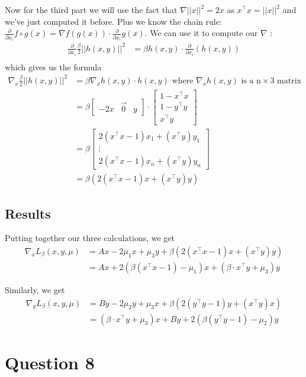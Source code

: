 \documentclass{article}
\newcommand{\tp}{^\top}
\newcommand{\p}{\frac{\partial}{\partial x_i}}
\begin{document}
Now for the third part we will use the fact that $\nabla||x||^2=2x$ as $x\tp x=||x||^2$ and we've just computed it before. Plus we know the chain rule: $\p f\circ g(x)= \nabla f (g(x)) \cdot \p g(x)$. We can use it to compute our $\nabla$ :
\begin{align*}
\p \frac{\beta}{2} ||h(x,y)||^2&=\beta h(x,y) \cdot \p(h(x,y))\\
\end{align*}
which gives us the formula
\begin{align*}
\nabla_x \frac{\beta}{2} ||h(x,y)||^2&=\beta \nabla_x h(x,y) \cdot  h(x,y) \text{ where } \nabla_x h(x,y) \text{ is a n} \times \text{3 matrix}\\
&=\beta\begin{bmatrix} -2x & \vec 0 & y \end{bmatrix}   \cdot \begin{bmatrix} 1-x\tp x \\ 1-y\tp y\\ x\tp y \end{bmatrix} \\
&=\beta\begin{bmatrix}2(x\tp x-1) x_1+(x\tp y )y_1\\ \vdots \\ 2(x\tp x-1) x_n+(x\tp y )y_n \end{bmatrix}\\
&=\beta \left( 2(x\tp x-1)  x+(x\tp y ) y \right) 
\end{align*}


\subsection*{Results}
Putting together our three calculations, we get
\begin{align*}
\nabla_x L_\beta(x,y,\mu)&=Ax - 2\mu_1 x+\mu_3 y+\beta \left( 2(x\tp x-1) x+(x\tp y ) y \right) \\
&=Ax+ 2(\beta (x\tp x-1) - \mu_1) x +(\beta \cdot x\tp y + \mu_3)y
\end{align*}

Similarly, we get
\begin{align*}
\nabla_y L_\beta(x,y,\mu)&=By - 2\mu_2 y+\mu_3 x+\beta \left( 2(y\tp y-1)  y+(x\tp y ) x \right) \\
&=(\beta \cdot x\tp y + \mu_3)x+ By + 2(\beta (y\tp y-1) - \mu_2) y
\end{align*}


\section*{Question 8}
\end{document}
